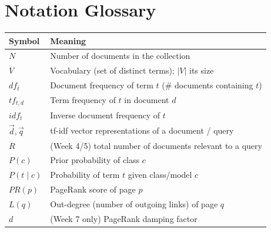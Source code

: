 \documentclass[11pt, a4paper]{article}
\begin{document}
\section*{Notation Glossary}

\begin{center}
\begin{tabular}{@{}lp{11.5cm}@{}}
\toprule
Symbol & Meaning \\
\midrule
$N$ & Number of documents in the collection \\
$V$ & Vocabulary (set of distinct terms); $|V|$ its size \\
$df_t$ & Document frequency of term $t$ (\# documents containing $t$) \\
$tf_{t,d}$ & Term frequency of $t$ in document $d$ \\
$idf_t$ & Inverse document frequency of $t$ \\
$\vec d,\vec q$ & tf-idf vector representations of a document / query \\
$R$ & (Week 4/5) total number of documents relevant to a query \\
$P(c)$ & Prior probability of class $c$ \\
$P(t\mid c)$ & Probability of term $t$ given class/model $c$ \\
$PR(p)$ & PageRank score of page $p$ \\
$L(q)$ & Out-degree (number of outgoing links) of page $q$ \\
$d$ & (Week 7 only) PageRank damping factor \\
\bottomrule
\end{tabular}
\end{center}
\end{document}

